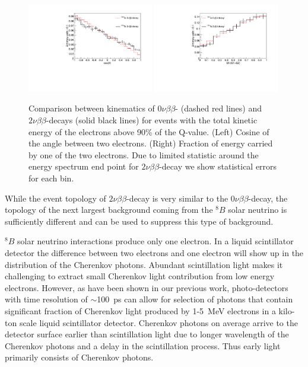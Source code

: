 \documentclass[12pt,twoside,letterpaper]{article}
\newcommand{\vbb}{0\nu\beta\beta}
\newcommand{\vvbb}{2\nu\beta\beta}
\newcommand{\B}{^{8}B}
\begin{document}
\begin{figure}[htb]
\centering
\includegraphics[angle=0,width=0.49\textwidth]{plots/hCos_Te130.pdf}
\includegraphics[angle=0,width=0.49\textwidth]{plots/hE1toQ_Te130.pdf}
\caption{Comparison between kinematics of $\vbb$- (dashed red lines) and $\vvbb$-decays (solid black lines) for events with the total kinetic energy of the electrons above 90\% of the Q-value. (Left) Cosine of the angle between two electrons. (Right) Fraction of energy carried by one of the two electrons. Due to limited statistic around the energy spectrum end point for $\vvbb$-decay we show statistical errors for each bin.}
\label{fig:Kinematics}
\end{figure}


While the event topology of $\vvbb$-decay is very similar to the $\vbb$-decay, the topology of the next largest background coming from the $\B$ solar neutrino is sufficiently different and can be used to suppress this type of background. 

$\B$ solar neutrino interactions produce only one electron. In a liquid scintillator detector the difference between two electrons and one electron will show up in the distribution of the Cherenkov photons. Abundant scintillation light makes it challenging to extract small Cherenkov light contribution from low energy electrons. However, as have been shown in our previous work, photo-detectors with time resolution of $\sim$100~ps can allow for selection of photons that contain significant fraction of Cherenkov light produced by 1-5~MeV electrons in a kilo-ton scale liquid scintillator detector. Cherenkov photons on average arrive to the detector surface earlier than scintillation light due to longer wavelength of the Cherenkov photons and a delay in the scintillation process. Thus early light primarily consists of Cherenkov photons.
\end{document}
